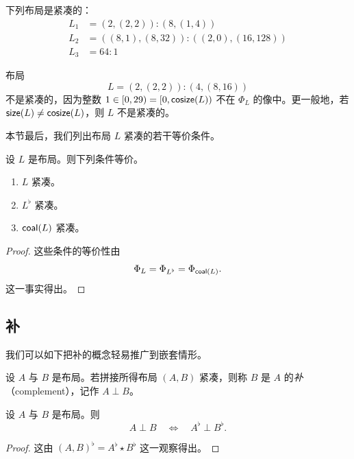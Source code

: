 \begin{example}
    下列布局是紧凑的：
    \begin{align*}
        L_1 & = (2,(2,2)):(8,(1,4))\\
        L_2 & = ((8,1),(8,32)):((2,0),(16,128))\\
        L_3 & = 64:1
    \end{align*}
\end{example}

\begin{example}
    布局
    \[
    L = (2,(2,2)):(4,(8,16))
    \]
    不是紧凑的，因为整数 $1 \in [0,29) = [0,\mathsf{cosize}(L))$ 不在 $\Phi_L$ 的像中。更一般地，若 $\mathsf{size}(L) \neq \mathsf{cosize}(L)$，则 $L$ 不是紧凑的。
\end{example}

本节最后，我们列出布局 $L$ 紧凑的若干等价条件。
\begin{proposition} \label{equivalentconditionsfornestedcompact}
设 $L$ 是布局。则下列条件等价。
\begin{enumerate}
    \item $L$ 紧凑。
    \item $L^\flat$ 紧凑。
    \item $\mathsf{coal}(L)$ 紧凑。
\end{enumerate}
\end{proposition}
\begin{proof}
    这些条件的等价性由
    \[
    \Phi_L = \Phi_{L^\flat} = \Phi_{\mathsf{coal}(L)}.
    \]
    这一事实得出。
\end{proof}

\subsection{补}

我们可以如下把补的概念轻易推广到嵌套情形。

\begin{definition}
    设 $A$ 与 $B$ 是布局。若拼接所得布局 $(A,B)$ 紧凑，则称 $B$ 是 $A$ 的{\it 补}（complement），记作 $A \perp B$。
\end{definition}

\begin{lemma}\label{flatteningcomplementationlemma}
    设 $A$ 与 $B$ 是布局。则
    \[
    A \perp B \quad \Leftrightarrow \quad A^\flat \perp B^\flat.
    \]
\end{lemma}

\begin{proof}
    这由 $(A,B)^\flat = A^\flat \star B^\flat$ 这一观察得出。
\end{proof}


